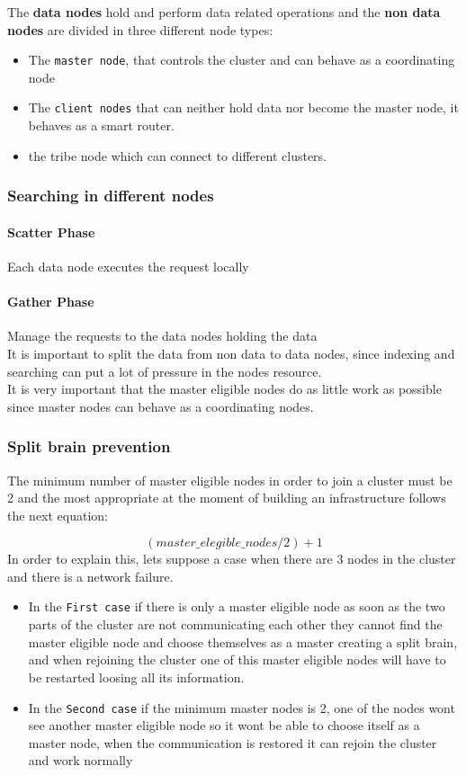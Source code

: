 The \textbf{data nodes} hold and perform data related operations and the \textbf{non data nodes} are divided in three different node types:
\begin{itemize}
\item The \texttt{master node}, that controls the cluster and can behave as a coordinating node
\item The \texttt{client nodes} that can neither hold data nor become the master node, it behaves as a smart router.
\item the {tribe node} which can connect to different clusters.
\end{itemize}
\subsubsection{Searching in different nodes}
\paragraph{Scatter Phase} Each data node executes the request locally
\paragraph{Gather Phase} Manage the requests to the data nodes holding the data\\

It is important to split the data from non data to data nodes, since indexing and searching can put a lot of pressure in the nodes resource. 
\\

It is very important that the master eligible nodes do as little work as possible since master nodes can behave as a coordinating nodes.

\subsubsection{Split brain prevention}
The minimum number of master eligible nodes in order to join a cluster must be 2 and the most appropriate at the moment of building an infrastructure follows the next equation:

\begin{equation}
(master\_elegible\_nodes / 2)+1
\end{equation}
In order to explain this, lets suppose a case when there are 3 nodes in the cluster and there is a network failure.
\begin{itemize}
\item In the \texttt{First case} if there is only a master eligible node as soon as the two parts of the cluster are not communicating each other they cannot find the master eligible node and choose themselves as a master creating a split brain, and when rejoining the cluster one of this master eligible nodes will have to be restarted loosing all its information.
\item In the \texttt{Second case} if the minimum master nodes is 2, one of the nodes wont see another master eligible node so it wont be able to choose itself as a master node, when the communication is restored it can rejoin the cluster and work normally 
\end{itemize}

